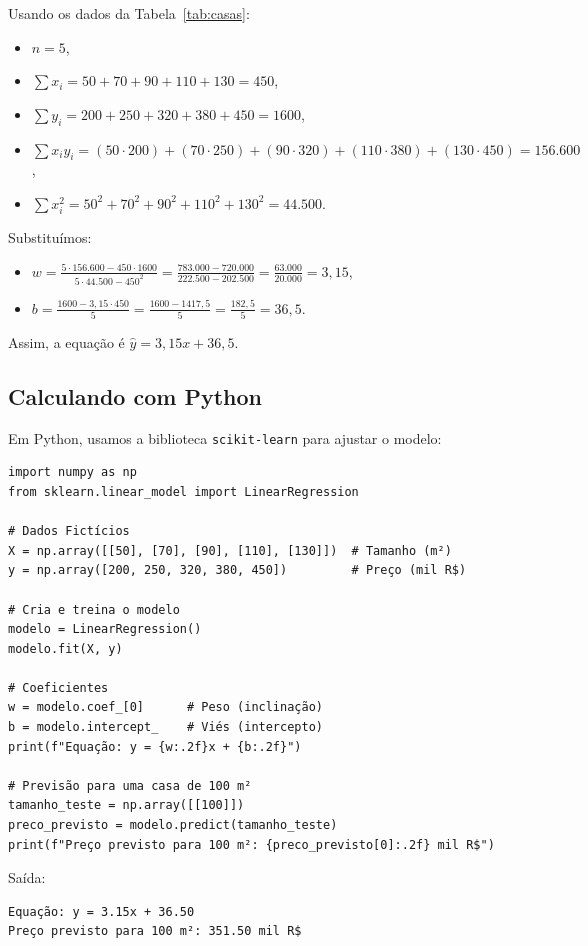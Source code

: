 \documentclass[a4paper,12pt,openany]{book}
\begin{document}
Usando os dados da Tabela~\ref{tab:casas}:
\begin{itemize}
    \item \(n = 5\),
    \item \(\sum x_i = 50 + 70 + 90 + 110 + 130 = 450\),
    \item \(\sum y_i = 200 + 250 + 320 + 380 + 450 = 1600\),
    \item \(\sum x_i y_i = (50 \cdot 200) + (70 \cdot 250) + (90 \cdot 320) + (110 \cdot 380) + (130 \cdot 450) = 156.600\),
    \item \(\sum x_i^2 = 50^2 + 70^2 + 90^2 + 110^2 + 130^2 = 44.500\).
\end{itemize}
Substituímos:
\begin{itemize}
    \item \(w = \frac{5 \cdot 156.600 - 450 \cdot 1600}{5 \cdot 44.500 - 450^2} = \frac{783.000 - 720.000}{222.500 - 202.500} = \frac{63.000}{20.000} = 3,15\),
    \item \(b = \frac{1600 - 3,15 \cdot 450}{5} = \frac{1600 - 1417,5}{5} = \frac{182,5}{5} = 36,5\).
\end{itemize}
Assim, a equação é \(\hat{y} = 3,15x + 36,5\).

\subsection{Calculando com Python}
Em Python, usamos a biblioteca \texttt{scikit-learn} para ajustar o modelo:

\begin{verbatim}
import numpy as np
from sklearn.linear_model import LinearRegression

# Dados Fictícios
X = np.array([[50], [70], [90], [110], [130]])  # Tamanho (m²)
y = np.array([200, 250, 320, 380, 450])         # Preço (mil R$)

# Cria e treina o modelo
modelo = LinearRegression()
modelo.fit(X, y)

# Coeficientes
w = modelo.coef_[0]      # Peso (inclinação)
b = modelo.intercept_    # Viés (intercepto)
print(f"Equação: y = {w:.2f}x + {b:.2f}")

# Previsão para uma casa de 100 m²
tamanho_teste = np.array([[100]])
preco_previsto = modelo.predict(tamanho_teste)
print(f"Preço previsto para 100 m²: {preco_previsto[0]:.2f} mil R$")
\end{verbatim}
Saída: 
\begin{verbatim}
Equação: y = 3.15x + 36.50
Preço previsto para 100 m²: 351.50 mil R$
\end{verbatim}
\end{document}
